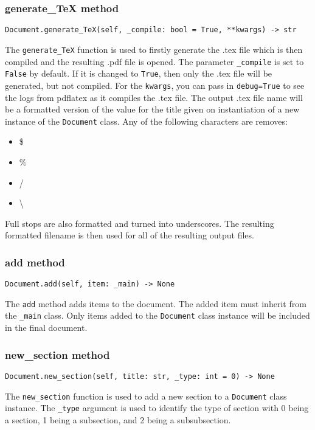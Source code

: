 \documentclass{article}
\begin{document}
\subsubsection{generate\_TeX method}\label{subsubsec:generate_tex_method}
\begin{verbatim}
Document.generate_TeX(self, _compile: bool = True, **kwargs) -> str
\end{verbatim}
The \verb|generate_TeX| function is used to firstly generate the .tex file which is then compiled and the resulting .pdf file is opened. The parameter \verb|_compile| is set to \verb|False| by default. If it is changed to \verb|True|, then only the .tex file will be generated, but not compiled. For the \verb|kwargs|, you can pass in \verb|debug=True| to see the logs from pdflatex as it compiles the .tex file.
The output .tex file name will be a formatted version of the value for the title given on instantiation of a new instance of the \verb|Document| class. Any of the following characters are removes:\begin{itemize}
\item \$
\item \%
\item /
\item \textbackslash
\end{itemize}
Full stops are also formatted and turned into underscores. The resulting formatted filename is then used for all of the resulting output files.
\subsubsection{add method}\label{subsubsec:add_method}
\begin{verbatim}
Document.add(self, item: _main) -> None
\end{verbatim}
The \verb|add| method adds items to the document. The added item must inherit from the \verb|_main| class. Only items added to the \verb|Document| class instance will be included in the final document.
\subsubsection{new\_section method}\label{subsubsec:new_section_method}
\begin{verbatim}
Document.new_section(self, title: str, _type: int = 0) -> None
\end{verbatim}
The \verb|new_section| function is used to add a new section to a \verb|Document| class instance. The \verb|_type| argument is used to identify the type of section with 0 being a section, 1 being a subsection, and 2 being a subsubsection.
\end{document}
